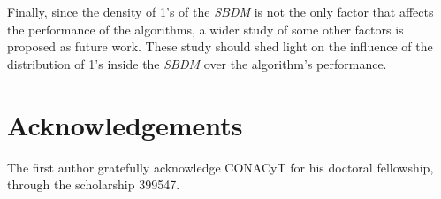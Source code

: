 \documentclass[number,preprint,review,12pt]{elsarticle}
\begin{document}
	Finally, since the density of 1's of the \textit{SBDM} is not the only factor that affects the performance of the algorithms, a wider study of some other factors is proposed as future work. These study should shed light on the influence of the distribution of 1's inside the \textit{SBDM} over the algorithm's performance. 

\section{Acknowledgements}
	The first author gratefully acknowledge CONACyT for his doctoral fellowship, through the scholarship 399547.
\newpage 
{}

\end{document}
